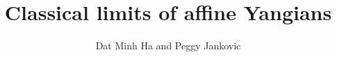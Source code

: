 

\setcounter{section}{-1}




\newcommand{\toroidal}{ \boldsymbol{ \caly } } %
\newcommand{\extendedtoroidal}{ \hat{ \boldsymbol{ \caly } } } %
\renewcommand{\simpleroots}{\mathbb{I}}
\newcommand{\divzero}{\der_{\gamma}(A)}



    \title{Classical limits of affine Yangians}
    
    \author{Dat Minh Ha and Peggy Jankovic}
    \maketitle
    
    \begin{abstract}
        
    \end{abstract}
    
    {
    \hypersetup{} 
    \tableofcontents %
    }

    

    

    

    
    
    \printbibliography

